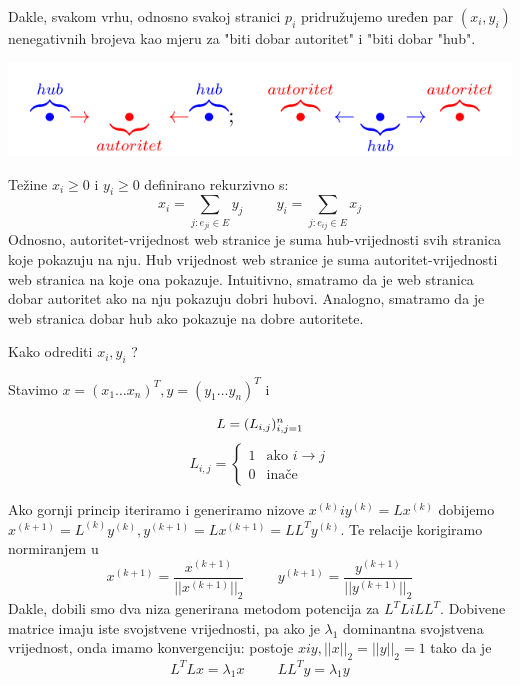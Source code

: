 \documentclass[11pt]{article}
\begin{document}
Dakle, svakom vrhu, odnosno svakoj stranici $p_{i}$ pridružujemo uređen par $(x_{i}, y_{i})$ nenegativnih brojeva kao mjeru za "biti dobar autoritet" i "biti dobar "hub".

\begin{center}
\includegraphics[width= \textwidth]{hubovi.png}    
\end{center}

Težine $x_{i} \geq 0$ i $y_{i} \geq 0$ definirano rekurzivno s:
\begin{equation} \label{eq:1}
x_{i} = \sum_{j: e_{ji}\in E} y_{j} \hspace{1cm}  y_{i} = \sum_{j: e_{ij}\in E} x_{j}
\end{equation}
Odnosno, autoritet-vrijednost web stranice je suma hub-vrijednosti svih stranica koje pokazuju na nju. Hub vrijednost web stranice je suma autoritet-vrijednosti web stranica na koje ona pokazuje.
Intuitivno, smatramo da je web stranica dobar autoritet ako na nju pokazuju dobri hubovi. Analogno, smatramo da je web stranica dobar hub ako pokazuje na dobre autoritete.

\newpage
Kako odrediti $ x_{i}, y_{i} $ ?

Stavimo $x=(x_{1} \ldots x_{n})^{T}, y=(y_{1} \ldots y_{n})^{T} $ i 

\begin{equation*}
    L = (L_{i,j})_{i,j=1} ^{n} \\
\end{equation*}
\begin{equation*}
    L_{i,j} =  \left\{
	\begin{array}{ll}
		1  & \mbox{ako } i \longrightarrow j \\
		0 & \mbox{inače }
	\end{array}
\right.
\end{equation*}

\newline
Ako gornji princip iteriramo i generiramo nizove $x^{(k)} i y^{(k)} = Lx^{(k)}$ dobijemo $x^{(k+1)} = L^{(k)}y^{(k)}, y^{(k+1)} = Lx^{(k+1)} = L L^{T}y^{(k)} $.
\newline
Te relacije korigiramo normiranjem u 
\begin{equation*}
x^{(k+1)} = \frac{x^{(k+1)}}{||x^{(k+1)}||_{2}}\hspace{1cm}y^{(k+1)} = \frac{y^{(k+1)}}{||y^{(k+1)}||_{2}}
\end{equation*}
\newline
Dakle, dobili smo dva niza generirana metodom potencija za $L^{T}L i LL^{T}$.
Dobivene matrice imaju iste svojstvene vrijednosti, pa ako je $\lambda_{1}$ dominantna svojstvena vrijednost, onda imamo konvergenciju: postoje $x i y, ||x||_{2} = ||y||_{2} = 1$ tako da je
\begin{equation*}
    L^{T}Lx = \lambda_{1}x \hspace{1cm}  LL^{T}y = \lambda_{1}y
\end{equation*}
\end{document}
